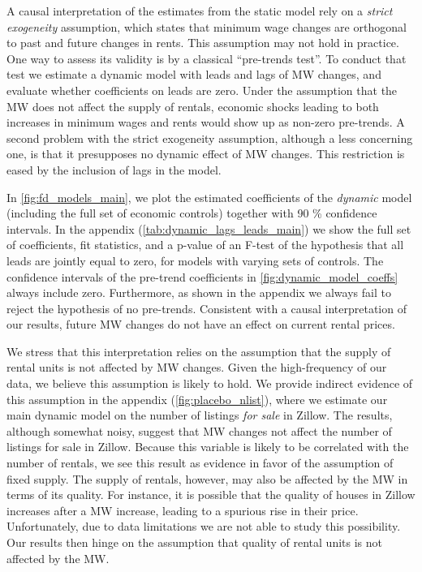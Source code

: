 A causal interpretation of the estimates from the static model rely on a \textit{strict exogeneity} 
assumption, which states that minimum wage changes are orthogonal to past and future changes in rents.
This assumption may not hold in practice. One way to assess its validity is by a classical 
``pre-trends test''. To conduct that test we estimate a dynamic model with leads and lags of MW 
changes, and evaluate whether coefficients on leads are zero. Under the assumption that the MW does 
not affect the supply of rentals, economic shocks leading to both increases in minimum wages and 
rents would show up as non-zero pre-trends. A second problem with the strict exogeneity assumption, 
although a less concerning one, is that it presupposes no dynamic effect of MW changes. This 
restriction is eased by the inclusion of lags in the model.

In \autoref{fig:fd_models_main}, we plot the estimated coefficients of the \textit{dynamic} model 
(including the full set of economic controls) together with 90 \% confidence intervals. In the 
appendix (\autoref{tab:dynamic_lags_leads_main}) we show the full set of coefficients, fit 
statistics, and a p-value of an F-test of the hypothesis that all leads are jointly equal to zero, 
for models with varying sets of controls. The confidence intervals of the pre-trend coefficients in 
\autoref{fig:dynamic_model_coeffs} always include zero. Furthermore, as shown in the appendix we 
always fail to reject the hypothesis of no pre-trends. Consistent with a causal interpretation of 
our results, future MW changes do not have an effect on current rental prices. 

We stress that this interpretation relies on the assumption that the supply of rental units is 
not affected by MW changes. Given the high-frequency of our data, we believe this assumption is 
likely to hold. We provide indirect evidence of this assumption in the appendix  
(\autoref{fig:placebo_nlist}), where we estimate our main dynamic model on the number of listings 
\textit{for sale} in Zillow. The results, although somewhat noisy, suggest that MW changes not 
affect the number of listings for sale in Zillow. Because this variable is likely to be correlated 
with the number of rentals, we see this result as evidence in favor of the assumption of fixed supply. 
The supply of rentals, however, may also be affected by the MW in terms of its quality. For instance, 
it is possible that the quality of houses in Zillow increases after a MW increase, leading to a 
spurious rise in their price.  Unfortunately, due to data limitations we are not able to study this 
possibility. Our results then hinge on the assumption that quality of rental units is not affected 
by the MW.

